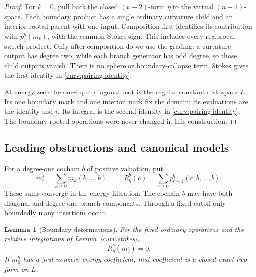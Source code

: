 \documentclass[11pt]{article}
\numberwithin{equation}{section}
\newtheorem{lemma}[theorem]{Lemma}
\theoremstyle{definition}
\theoremstyle{remark}
\begin{document}
\begin{proof}
For $k=0$, pull back the closed $(n-2)$-form $\eta$ to the virtual
$(n-1)$-space.  Each boundary product has a single ordinary
curvature child and an interior-rooted parent with one input.
Composition first identifies its contribution with
$p_1^\eta(m_0)$, with the common Stokes sign.  This includes every
reciprocal-switch product.  Only after composition do we use the
grading: a curvature output has degree two, while each branch
generator has odd degree, so those child outputs vanish.
There is no sphere or boundary-collapse term.  Stokes gives the
first identity in \eqref{curv:pairing-identity}.

At energy zero the one-input diagonal root is the regular constant
disk space $L$.  Its one boundary mark and one interior mark fix
the domain; its evaluations are the identity and $i$.  Its integral
is the second identity in \eqref{curv:pairing-identity}.  The
boundary-rooted operations were never changed in this construction.
\end{proof}

\subsection{Leading obstructions and canonical models}

For a degree-one cochain $b$ of positive valuation, put
\[
 m_0^b=\sum_{k\geq0}m_k(b,\ldots,b),
 \qquad
 R_\eta^b(c)=\sum_{r\geq0}p_{r+1}^\eta(c,b,\ldots,b).
\]
These sums converge in the energy filtration.  The cochain $b$ may
have both diagonal and degree-one branch components.  Through a
fixed cutoff only boundedly many insertions occur.

\begin{lemma}[Boundary deformations]\label{curv:deformation}
For the fixed ordinary operations and the relative integrations of
Lemma~\ref{curv:stokes},
\begin{equation}\label{curv:deformed-pairing}
 R_\eta^b(m_0^b)=0.
\end{equation}
If $m_0^b$ has a first nonzero energy coefficient, that coefficient
is a closed exact two-form on $L$.
\end{lemma}
\end{document}
